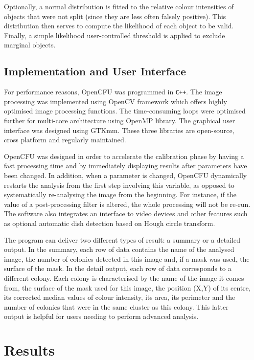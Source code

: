 \documentclass[10pt]{article}
\begin{document}
Optionally, a normal distribution is fitted to the relative colour intensities of
objects that were not split (since they are less often falsely positive). This
distribution then serves to compute the likelihood of each object to be valid.
Finally, a simple likelihood user-controlled threshold is applied to exclude
marginal objects.


 \subsection*{Implementation and User Interface} For performance reasons, OpenCFU was
programmed in \texttt{C++}. The image processing was implemented using OpenCV framework\cite{opencv_library}
 which offers highly optimised image processing functions.
The time-consuming loops were optimised further for multi-core architecture using
OpenMP library\cite{openmp11}. The graphical user interface was designed using GTKmm.
These three libraries are open-source, cross platform and regularly maintained.

OpenCFU was designed in order to accelerate the calibration phase by having a
fast processing time and by immediately displaying results after parameters have
been changed. In addition, when a parameter is changed, OpenCFU dynamically restarts the analysis from
the first step involving this variable, as opposed to systematically re-analysing the image
from 
the beginning. For instance, if the value of a post-processing filter is altered, the whole processing will not be re-run.
The software also integrates an interface to video
devices and
other features such as optional
automatic dish detection based on Hough circle transform.


The program can deliver two different types of result: a summary or a detailed 
output. In the summary, each row of data contains
the name of the analysed image, the number of 
colonies
detected in this image and, if a mask was used, the surface of the mask.
In the detail output, each row of data corresponds to a different colony. 
Each colony is characterised by the name of the image it comes from,
the surface of the mask used for this image,
the position (X,Y) of its centre, its corrected median values of colour intensity,
its area, its perimeter and the number of colonies that were in the same cluster 
as
this colony. This latter output is helpful for users needing
to perform advanced analysis.


\section*{Results}
\end{document}
